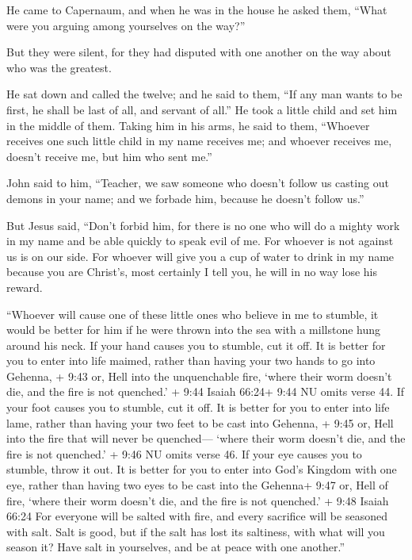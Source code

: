  He came to Capernaum, and when he was in the house he
asked them, ``What were you arguing among yourselves on the way?''

 But they were silent, for they had disputed with one
another on the way about who was the greatest.

 He sat down and called the twelve; and he said to them,
``If any man wants to be first, he shall be last of all, and servant of
all.''  He took a little child and set him in the middle of
them. Taking him in his arms, he said to them,  ``Whoever
receives one such little child in my name receives me; and whoever
receives me, doesn't receive me, but him who sent me.''

 John said to him, ``Teacher, we saw someone who doesn't
follow us casting out demons in your name; and we forbade him, because
he doesn't follow us.''

 But Jesus said, ``Don't forbid him, for there is no one
who will do a mighty work in my name and be able quickly to speak evil
of me.  For whoever is not against us is on our side.
 For whoever will give you a cup of water to drink in my
name because you are Christ's, most certainly I tell you, he will in no
way lose his reward.

 ``Whoever will cause one of these little ones who believe
in me to stumble, it would be better for him if he were thrown into the
sea with a millstone hung around his neck.  If your hand
causes you to stumble, cut it off. It is better for you to enter into
life maimed, rather than having your two hands to go into Gehenna, +
9:43 or, Hell into the unquenchable fire,  `where their
worm doesn't die, and the fire is not quenched.' + 9:44 Isaiah 66:24+
9:44 NU omits verse 44.  If your foot causes you to
stumble, cut it off. It is better for you to enter into life lame,
rather than having your two feet to be cast into Gehenna, + 9:45 or,
Hell into the fire that will never be quenched---  `where
their worm doesn't die, and the fire is not quenched.' + 9:46 NU omits
verse 46.  If your eye causes you to stumble, throw it out.
It is better for you to enter into God's Kingdom with one eye, rather
than having two eyes to be cast into the Gehenna+ 9:47 or, Hell of fire,
 `where their worm doesn't die, and the fire is not
quenched.' + 9:48 Isaiah 66:24  For everyone will be salted
with fire, and every sacrifice will be seasoned with salt. 
Salt is good, but if the salt has lost its saltiness, with what will you
season it? Have salt in yourselves, and be at peace with one another.''

